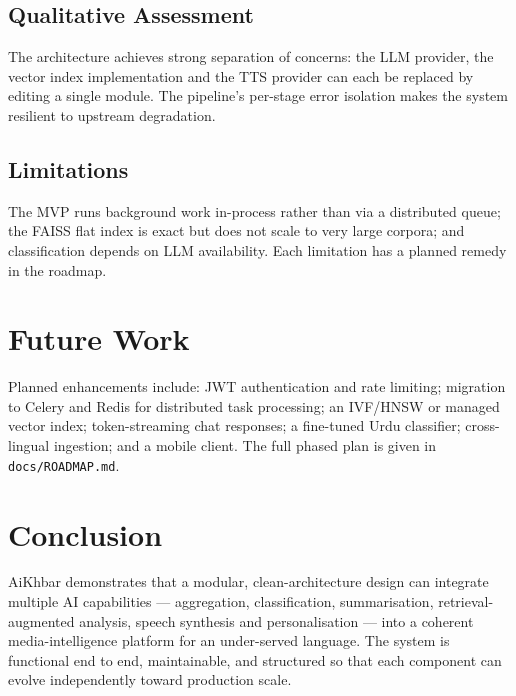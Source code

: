 \documentclass[11pt,a4paper]{article}
\begin{document}
\subsection{Qualitative Assessment}
The architecture achieves strong separation of concerns: the LLM provider, the
vector index implementation and the TTS provider can each be replaced by
editing a single module. The pipeline's per-stage error isolation makes the
system resilient to upstream degradation.

\subsection{Limitations}
The MVP runs background work in-process rather than via a distributed queue;
the FAISS flat index is exact but does not scale to very large corpora; and
classification depends on LLM availability. Each limitation has a planned
remedy in the roadmap.

\section{Future Work}

Planned enhancements include: JWT authentication and rate limiting; migration
to Celery and Redis for distributed task processing; an IVF/HNSW or managed
vector index; token-streaming chat responses; a fine-tuned Urdu classifier;
cross-lingual ingestion; and a mobile client. The full phased plan is given in
\texttt{docs/ROADMAP.md}.

\section{Conclusion}

AiKhbar demonstrates that a modular, clean-architecture design can integrate
multiple AI capabilities --- aggregation, classification, summarisation,
retrieval-augmented analysis, speech synthesis and personalisation --- into a
coherent media-intelligence platform for an under-served language. The system
is functional end to end, maintainable, and structured so that each component
can evolve independently toward production scale.

\appendix
\end{document}
